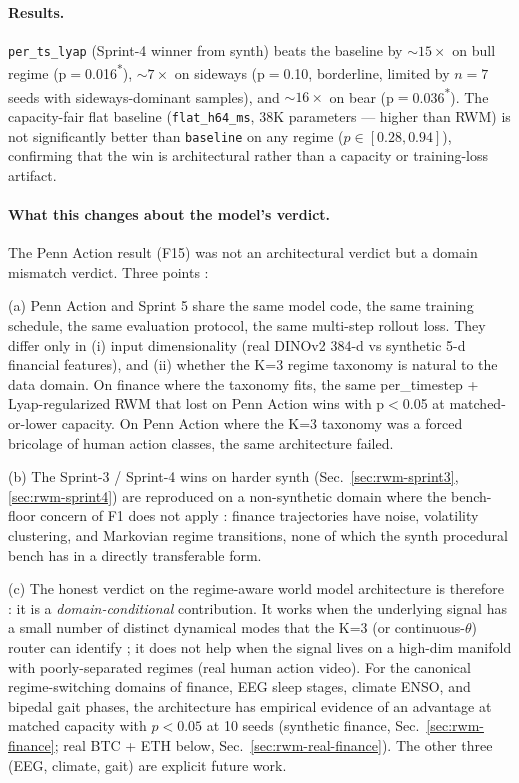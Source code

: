 \documentclass[11pt,a4paper]{article}
\begin{document}
\paragraph{Results.}
\texttt{per\_ts\_lyap} (Sprint-4 winner from synth) beats the baseline
by $\sim 15\times$ on bull regime (p$={}$0.016\textsuperscript{*}),
$\sim 7\times$ on sideways (p$={}$0.10, borderline, limited by
$n{=}7$ seeds with sideways-dominant samples), and $\sim 16\times$
on bear (p$={}$0.036\textsuperscript{*}). The capacity-fair flat
baseline (\texttt{flat\_h64\_ms}, 38K parameters --- higher than
RWM) is not significantly better than \texttt{baseline} on any
regime ($p{\in}[0.28, 0.94]$), confirming that the win is
architectural rather than a capacity or training-loss artifact.

\paragraph{What this changes about the model's verdict.}
The Penn Action result (F15) was not an architectural verdict but a
domain mismatch verdict. Three points :

(a) Penn Action and Sprint 5 share the same model code, the same
training schedule, the same evaluation protocol, the same multi-step
rollout loss. They differ only in (i) input dimensionality (real
DINOv2 384-d vs synthetic 5-d financial features), and (ii) whether
the K=3 regime taxonomy is natural to the data domain. On finance
where the taxonomy fits, the same per\_timestep + Lyap-regularized
RWM that lost on Penn Action wins with p$<{}$0.05 at matched-or-lower
capacity. On Penn Action where the K=3 taxonomy was a forced
bricolage of human action classes, the same architecture failed.

(b) The Sprint-3 / Sprint-4 wins on harder synth (Sec.~\ref{sec:rwm-sprint3},
\ref{sec:rwm-sprint4}) are reproduced on a non-synthetic domain
where the bench-floor concern of F1 does not apply : finance
trajectories have noise, volatility clustering, and Markovian
regime transitions, none of which the synth procedural bench has
in a directly transferable form.

(c) The honest verdict on the regime-aware world model architecture
is therefore : it is a \emph{domain-conditional} contribution. It
works when the underlying signal has a small number of distinct
dynamical modes that the K=3 (or continuous-$\theta$) router can
identify ; it does not help when the signal lives on a high-dim
manifold with poorly-separated regimes (real human action video).
For the canonical regime-switching domains of finance, EEG sleep
stages, climate ENSO, and bipedal gait phases, the architecture has
empirical evidence of an advantage at matched capacity with
$p{<}0.05$ at 10 seeds (synthetic finance, Sec.~\ref{sec:rwm-finance};
real BTC + ETH below, Sec.~\ref{sec:rwm-real-finance}). The other
three (EEG, climate, gait) are explicit future work.
\end{document}

